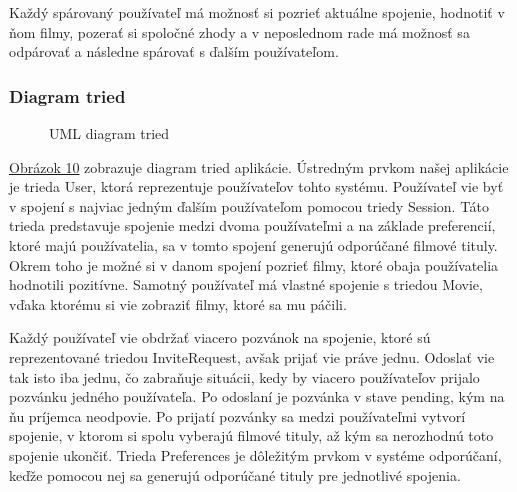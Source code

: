 Každý spárovaný používateľ má možnosť si pozrieť aktuálne spojenie, hodnotiť v ňom filmy, pozerať si spoločné zhody a v neposlednom rade má možnosť sa odpárovať a následne spárovať s ďalším používateľom. 

\subsubsection{Diagram tried}
\begin{figure}[hbt!]
  \centering  
  \def\stackalignment{c}
           {\scriptsize}
	\caption{UML diagram tried}  
  \label{classdiagram}
\end{figure}
\hyperref[classdiagram]{Obrázok 10} zobrazuje diagram tried aplikácie. Ústredným prvkom našej aplikácie je trieda User, ktorá reprezentuje používateľov tohto systému. Používateľ vie byť v spojení s najviac jedným ďalším používateľom pomocou triedy Session. Táto trieda predstavuje spojenie medzi dvoma používateľmi a na základe preferencií, ktoré majú používatelia, sa v tomto spojení generujú odporúčané filmové tituly. Okrem toho je možné si v danom spojení pozrieť filmy, ktoré obaja používatelia hodnotili pozitívne. Samotný používateľ má vlastné spojenie s triedou Movie, vďaka ktorému si vie zobraziť filmy, ktoré sa mu páčili.

Každý používateľ vie obdržať viacero pozvánok na spojenie, ktoré sú reprezentované triedou InviteRequest, avšak prijať vie práve jednu. Odoslať vie tak isto iba jednu, čo zabraňuje situácii, kedy by viacero používateľov prijalo pozvánku jedného používateľa. Po odoslaní je pozvánka v stave pending, kým na ňu príjemca neodpovie. Po prijatí pozvánky sa medzi používateľmi vytvorí spojenie, v ktorom si spolu vyberajú filmové tituly, až kým sa nerozhodnú toto spojenie ukončiť. Trieda Preferences je dôležitým prvkom v systéme odporúčaní, keďže pomocou nej sa generujú odporúčané tituly pre jednotlivé spojenia.

